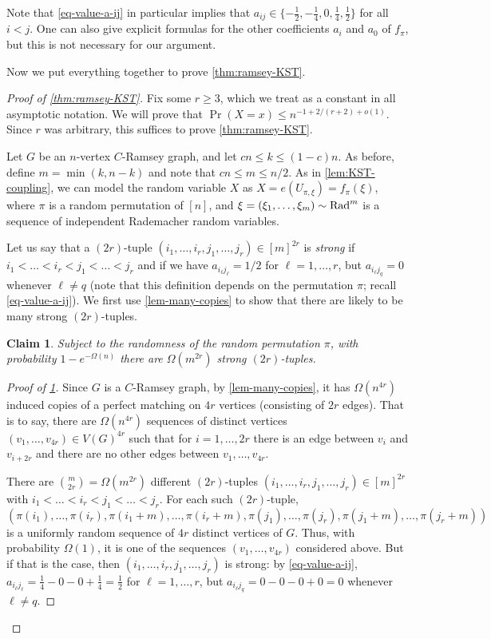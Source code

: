 \documentclass{daj}
\theoremstyle{plain}
\theoremstyle{plain}
\theoremstyle{plain}
\theoremstyle{plain}
\theoremstyle{definition}
\theoremstyle{plain}
\theoremstyle{plain}
\theoremstyle{definition}
\theoremstyle{definition}
\theoremstyle{plain}
\newtheorem{claim}[thm]{Claim}
\begin{document}
Note that \cref{eq-value-a-ij} in particular implies that $a_{ij}\in \lbrace -\frac{1}{2}, -\frac{1}{4}, 0, \frac{1}{4}, \frac{1}{2}\rbrace$ for all $i<j$. One can also give explicit formulas for the other coefficients $a_i$ and $a_0$ of $f_\pi$, but this is not necessary for our argument.

Now we put everything together to prove \cref{thm:ramsey-KST}.

\begin{proof}
[Proof of \cref{thm:ramsey-KST}]
Fix some $r\ge 3$, which we treat as a constant in all asymptotic notation. We will prove that $\Pr(X=x)\le n^{-1+2/(r+2)+o(1)}$. Since $r$ was arbitrary, this suffices to prove \cref{thm:ramsey-KST}.

Let $G$ be an $n$-vertex $C$-Ramsey graph, and let $cn\le k\le (1-c)n$. As before, define $m=\min(k,n-k)$ and note that $cn\leq m\leq n/2$. As in \cref{lem:KST-coupling}, we can model the random variable $X$ as $X=e(U_{\pi,\xi})=f_\pi(\xi)$, where $\pi$ is a random permutation of $[n]$, and $\xi=(\xi_1,\dots,\xi_m)\sim\operatorname{Rad}^m$ is a sequence of independent Rademacher random variables.

Let us say that a $(2r)$-tuple $(i_1,\dots,i_r,j_1,\dots,j_r)\in [m]^{2r}$ is \emph{strong} if $i_1<\dots<i_r<j_1<\dots<j_r$ and if we have $a_{i_\ell j_\ell}=1/2$ for $\ell=1,\dots,r$, but $a_{i_\ell j_q}=0$ whenever $\ell\neq q$ (note that this definition depends on the permutation $\pi$; recall \cref{eq-value-a-ij}). We first use \cref{lem-many-copies} to show that there are likely to be many strong $(2r)$-tuples.

\begin{claim}\label{claim-f-pi-tuples}
Subject to the randomness of the random permutation $\pi$, with probability $1-e^{-\Omega(n)}$ there are $\Omega(m^{2r})$ strong $(2r)$-tuples.
\end{claim}

\begin{proof}[Proof of \cref{claim-f-pi-tuples}]
Since $G$ is a $C$-Ramsey graph, by \cref{lem-many-copies}, it has $\Omega(n^{4r})$ induced copies of a perfect matching on $4r$ vertices (consisting of $2r$ edges). That is to say, there are $\Omega(n^{4r})$ sequences of distinct vertices $(v_1,\dots,v_{4r})\in V(G)^{4r}$ such that for $i=1,\dots,2r$ there is an edge between $v_i$ and $v_{i+2r}$ and there are no other edges between $v_1,\dots,v_{4r}$.

There are $\binom{m}{2r}=\Omega(m^{2r})$ different $(2r)$-tuples $(i_1,\dots,i_r,j_1,\dots,j_r)\in [m]^{2r}$ with $i_1<\dots<i_r<j_1<\dots<j_r$. For each such $(2r)$-tuple,
\[(\pi(i_1), \dots, \pi(i_r),\pi(i_1+m),\dots ,\pi(i_r+m),\pi(j_1), \dots, \pi(j_r),\pi(j_1+m),\dots ,\pi(j_r+m))\]
is a uniformly random sequence of $4r$ distinct vertices of $G$. Thus, with probability $\Omega(1)$, it is one of the sequences $(v_1,\dots,v_{4r})$ considered above. But if that is the case, then $(i_1,\dots,i_r,j_1,\dots,j_r)$ is strong: by \cref{eq-value-a-ij}, $a_{i_\ell j_\ell}=\frac{1}{4}-0-0+\frac{1}{4}=\frac{1}{2}$ for $\ell=1,\dots,r$, but $a_{i_\ell j_q}=0-0-0+0=0$ whenever $\ell\neq q$.


\end{proof}
\end{proof}
\end{document}
